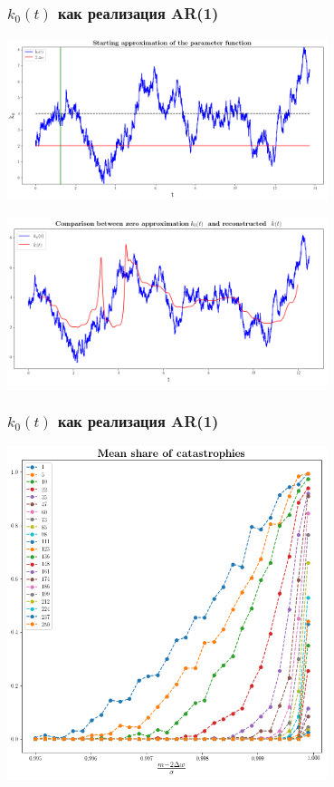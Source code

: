 \documentclass{beamer}
\begin{document}
\begin{frame}
\frametitle{$k_0(t)$ как реализация AR(1)}
\phantom{123}
\begin{center}
	\includegraphics[width=0.7\textwidth]{stk2.png} 
	
	\includegraphics[width=0.7\textwidth]{stk2-1.png}
\end{center}
\end{frame}

\begin{frame}
\frametitle{$k_0(t)$ как реализация AR(1)}
\phantom{123}
\begin{center}
	\includegraphics[width=0.7\textwidth]{sh1.png}
\end{center}
\end{frame}
\end{document}
